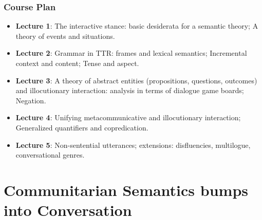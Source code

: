 \documentclass{beamer}
\newcommand{\bit}{\begin{itemize}}
\newcommand{\eit}{\end{itemize}}
\newcommand{\ben}{\begin{enumerate}}
\newcommand{\een}{\end{enumerate}}
\newcommand{\ignore}[1]{}
\begin{document}
\begin{frame}\frametitle{Course Plan}
\bit

\item  {\bf Lecture 1}: The interactive stance: basic desiderata for a semantic theory; A theory of events and situations.

\item {\bf Lecture 2}: Grammar in TTR: frames and lexical semantics;
  Incremental context and content; Tense and aspect.

\item {\bf Lecture 3}: A theory of abstract entities (propositions,
  questions, outcomes) and illocutionary
  interaction: analysis in terms of dialogue game boards; Negation.

\item {\bf Lecture 4}: Unifying metacommunicative and illocutionary
  interaction; Generalized quantifiers and copredication.

\item {\bf Lecture 5}: Non-sentential utterances; extensions:
  disfluencies, multilogue, conversational genres.

\eit
\end{frame}

\ignore{
\begin{frame}\frametitle{Course Plan}
\bit
\item


\eit
\end{frame}
}

\ignore{
\begin{frame}\frametitle{ Today      }
\ben

\item Understand basic assumptions of semantic theory needed to
  analyze NSUs
  and the problems they encounter when applied to conversation.
\item TTR: the basics.
\item A theory of events and situations: frames and lexical semantics
\een
\end{frame}
}


\section{Communitarian Semantics bumps into Conversation}
\end{document}
